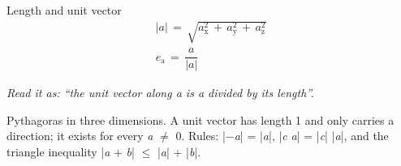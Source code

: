 \documentclass[11pt]{article}
\begin{document}
\begin{keepsection}
\begin{equationcard}{Length and unit vector}
\[ \begin{gathered} |{a}|\, =\, \sqrt{{a}_{\mathrm{x}}^{2}\, +\, {a}_{\mathrm{y}}^{2}\, +\, {a}_{\mathrm{z}}^{2}} \\ {e}_{\mathrm{a}}\, =\, \dfrac{{a}}{|{a}|} \end{gathered} \]
{\small \emph{Read it as: “the unit vector along a is a divided by its length”.}\par Pythagoras in three dimensions. A unit vector has length 1 and only carries a direction; it exists for every \textit{a} \ensuremath{\neq} 0. Rules: |\ensuremath{-}\textit{a}| = |\textit{a}|, |\textit{c} \textit{a}| = |\textit{c}| |\textit{a}|, and the triangle inequality |\textit{a} + \textit{b}| \ensuremath{\leq} |\textit{a}| + |\textit{b}|.}
\end{equationcard}
\end{keepsection}
\end{document}
